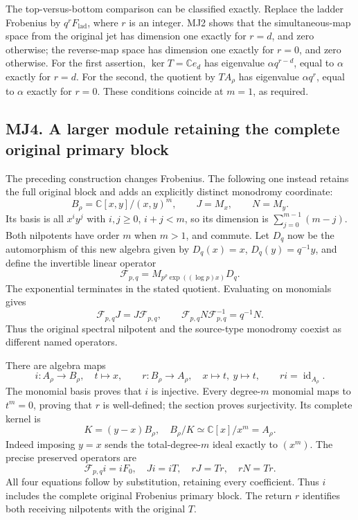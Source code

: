 The top-versus-bottom comparison can be classified exactly. Replace the
ladder Frobenius by \(q^rF_{\mathrm{lad}}\), where \(r\) is an integer.
MJ2 shows that the simultaneous-map space from the original jet has
dimension one exactly for \(r=d\), and zero otherwise; the reverse-map
space has dimension one exactly for \(r=0\), and zero otherwise. For the
first assertion, \(\ker T=\mathbb Ce_d\) has eigenvalue
\(\alpha q^{r-d}\), equal to \(\alpha\) exactly for \(r=d\). For the
second, the quotient by \(TA_\rho\) has eigenvalue \(\alpha q^r\), equal
to \(\alpha\) exactly for \(r=0\). These conditions coincide at \(m=1\),
as required.

\subsection{MJ4. A larger module retaining the complete original primary
block}\label{mj4.-a-larger-module-retaining-the-complete-original-primary-block}

The preceding construction changes Frobenius. The following one instead
retains the full original block and adds an explicitly distinct
monodromy coordinate: \[
B_\rho=\mathbb C[x,y]/(x,y)^m,\qquad J=M_x,\qquad N=M_y.
\tag{MJ4.1}
\] Its basis is all \(x^iy^j\) with \(i,j\ge0\), \(i+j<m\), so its
dimension is \(\sum_{j=0}^{m-1}(m-j)\). Both nilpotents have order \(m\)
when \(m>1\), and commute. Let \(D_q\) now be the automorphism of this
new algebra given by \(D_q(x)=x\), \(D_q(y)=q^{-1}y\), and define the
invertible linear operator \[
\mathcal F_{p,q}=M_{p^\rho\exp((\log p)x)}D_q.
\tag{MJ4.2}
\] The exponential terminates in the stated quotient. Evaluating on
monomials gives \[
\mathcal F_{p,q}J=J\mathcal F_{p,q},\qquad
\mathcal F_{p,q}N\mathcal F_{p,q}^{-1}=q^{-1}N.
\tag{MJ4.3}
\] Thus the original spectral nilpotent and the source-type monodromy
coexist as different named operators.

There are algebra maps \[
i:A_\rho\longrightarrow B_\rho,\quad t\longmapsto x,
\qquad r:B_\rho\longrightarrow A_\rho,\quad x\longmapsto t,\ y\longmapsto t,
\qquad ri=\operatorname{id}_{A_\rho}.
\tag{MJ4.4}
\] The monomial basis proves that \(i\) is injective. Every degree-\(m\)
monomial maps to \(t^m=0\), proving that \(r\) is well-defined; the
section proves surjectivity. Its complete kernel is \[
K=(y-x)B_\rho,
\quad B_\rho/K\simeq\mathbb C[x]/x^m=A_\rho.
\tag{MJ4.5}
\] Indeed imposing \(y=x\) sends the total-degree-\(m\) ideal exactly to
\((x^m)\). The precise preserved operators are \[
\mathcal F_{p,q}i=iF_0,\quad Ji=iT,\quad rJ=Tr,\quad rN=Tr.
\tag{MJ4.6}
\] All four equations follow by substitution, retaining every
coefficient. Thus \(i\) includes the complete original Frobenius primary
block. The return \(r\) identifies both receiving nilpotents with the
original \(T\).

